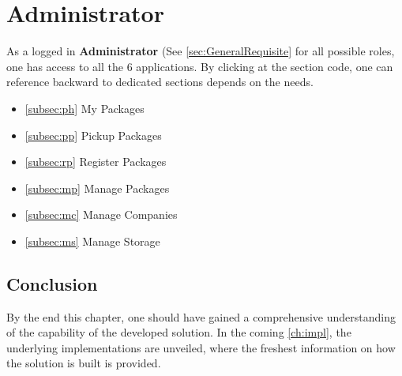 \pagebreak
\section{Administrator}
\label{sec:UdocAdministrator}

As a logged in \textbf{Administrator} (See \autoref{sec:GeneralRequisite} for all possible roles, one has access to all the 6 applications. By clicking at the section code, one can reference backward to dedicated sections depends on the needs. 

\begin{itemize}
    \item \ref{subsec:ph} My Packages
    \item \ref{subsec:pp} Pickup Packages
    \item \ref{subsec:rp} Register Packages
    \item \ref{subsec:mp} Manage Packages
    \item \ref{subsec:mc} Manage Companies
    \item \ref{subsec:ms} Manage Storage
\end{itemize}

\subsection*{Conclusion}

By the end this chapter, one should have gained a comprehensive understanding of the capability of the developed solution. In the coming \autoref{ch:impl}, the underlying implementations are unveiled, where the freshest information on how the solution is built is provided.